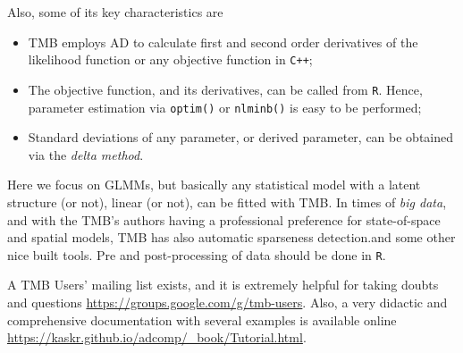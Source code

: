 Also, some of its key characteristics are

\begin{itemize}
\item TMB employs AD to calculate first and second order derivatives of
  the likelihood function or any objective function in \texttt{C++};
\item The objective function, and its derivatives, can be called from
  \texttt{R}. Hence, parameter estimation via \texttt{optim()} or
  \texttt{nlminb()} is easy to be performed;
\item Standard deviations of any parameter, or derived parameter, can be
  obtained via the \textit{delta method}.
\end{itemize}

Here we focus on GLMMs, but basically any statistical model with a
latent structure (or not), linear (or not), can be fitted with TMB. In
times of \textit{big data}, and with the TMB's authors having a
professional preference for state-of-space and spatial models, TMB has
also automatic sparseness detection.and some other nice built tools. Pre
and post-processing of data should be done in \texttt{R}.

A TMB Users' mailing list exists, and it is extremely helpful for taking
doubts and questions \url{https://groups.google.com/g/tmb-users}. Also,
a very didactic and comprehensive documentation with several examples is
available online
\url{https://kaskr.github.io/adcomp/_book/Tutorial.html}.

